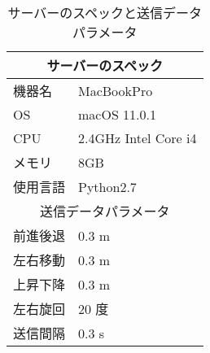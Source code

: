 \documentclass
[a4paper,11pt]{jreport}
\begin{document}
\begin{table}[bt]
  \begin{center}
  \caption{サーバーのスペックと送信データパラメータ}
    \begin{tabular}{|l|l|} \hline
    \multicolumn{2}{|c|}{サーバーのスペック}\\ \hline
    機器名 & MacBookPro \\ \hline
    OS & macOS 11.0.1 \\ \hline
    CPU & 2.4GHz Intel Core i4\\ \hline 
    メモリ & 8GB\\ \hline 
    使用言語 & Python2.7\\ \hline \hline
    \multicolumn{2}{|c|}{送信データパラメータ}\\ \hline
    前進後退 & 0.3 m\\ \hline
    左右移動 & 0.3 m\\ \hline
    上昇下降 & 0.3 m\\ \hline
    左右旋回 & 20 度\\ \hline
    送信間隔 & 0.3 s\\ \hline
    \end{tabular}
    \label{tab:spec}
  \end{center}
 \end{table}










\end{document}
